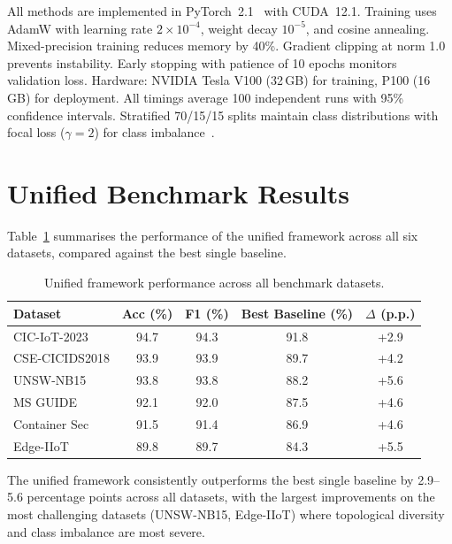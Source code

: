 All methods are implemented in PyTorch~2.1~\cite{Paszke2019} with CUDA~12.1. Training uses AdamW with learning rate $2\times10^{-4}$, weight decay $10^{-5}$, and cosine annealing. Mixed-precision training reduces memory by 40\%. Gradient clipping at norm 1.0 prevents instability. Early stopping with patience of 10 epochs monitors validation loss. Hardware: NVIDIA Tesla V100 (32\,GB) for training, P100 (16\,GB) for deployment. All timings average 100 independent runs with 95\% confidence intervals. Stratified 70/15/15 splits maintain class distributions with focal loss ($\gamma=2$) for class imbalance~\cite{Lin2017focal}.


\section{Unified Benchmark Results}
\label{sec:benchmark_results}

Table~\ref{tab:unified_results} summarises the performance of the unified framework across all six datasets, compared against the best single baseline.

\begin{table}[htbp]
\centering
\caption{Unified framework performance across all benchmark datasets.}
\label{tab:unified_results}
\begin{tabular}{lcccc}
\toprule
\textbf{Dataset} & \textbf{Acc (\%)} & \textbf{F1 (\%)} & \textbf{Best Baseline (\%)} & \textbf{$\Delta$ (p.p.)} \\
\midrule
CIC-IoT-2023    & 94.7 & 94.3 & 91.8 & +2.9 \\
CSE-CICIDS2018   & 93.9 & 93.9 & 89.7 & +4.2 \\
UNSW-NB15        & 93.8 & 93.8 & 88.2 & +5.6 \\
MS GUIDE         & 92.1 & 92.0 & 87.5 & +4.6 \\
Container Sec    & 91.5 & 91.4 & 86.9 & +4.6 \\
Edge-IIoT        & 89.8 & 89.7 & 84.3 & +5.5 \\
\bottomrule
\end{tabular}
\end{table}

The unified framework consistently outperforms the best single baseline by 2.9--5.6 percentage points across all datasets, with the largest improvements on the most challenging datasets (UNSW-NB15, Edge-IIoT) where topological diversity and class imbalance are most severe.

